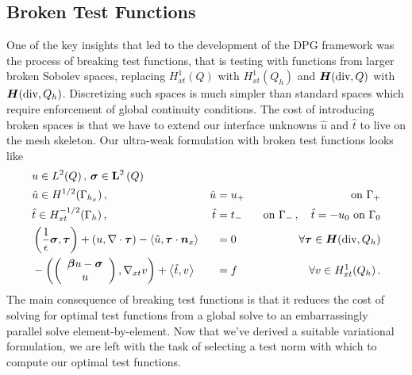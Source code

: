 \documentclass[Dissertation.tex]{subfiles}
\begin{document}
\subsection{Broken Test Functions}
One of the key insights that led to the development of the DPG framework was the process of breaking test functions, 
that is testing with functions from larger broken Sobolev spaces, replacing $H^1_{xt}(Q)$ with  $H^1_{xt}(Q_h)$ 
and $\mbox{\boldmath $H$}(\text{div},Q)$ with $\mbox{\boldmath $H$}(\text{div},Q_h)$.
Discretizing such spaces is much simpler than standard spaces which require enforcement of global continuity conditions.
The cost of introducing broken spaces is that we have to extend our interface unknowns $\hat u$ and $\hat t$ 
to live on the mesh skeleton. %
Our ultra-weak formulation with broken test functions looks like
\begin{equation}
\label{eq:confusionUltraWeakBrokenBF}
	\begin{aligned}
		&u\in L^2(Q)\,,\,\boldsymbol\sigma\in\mathbf{L}^2\left( Q \right)\\
		&\hat u\in H^{1/2}(\Gamma_{h_x})\,,\,&\hat u&=u_+&\text{ on }\Gamma_+\\
		&\hat t\in H^{-1/2}_{xt}(\Gamma_h)\,,\,&\hat t&=t_-&\text{ on }\Gamma_-\,,\quad\hat t=-u_0\text{ on }\Gamma_0\\
		&\left( \frac{1}{\epsilon}\boldsymbol\sigma,\boldsymbol\tau \right)+\left( u,\nabla\cdot\boldsymbol\tau \right)-\left\langle \hat u,\boldsymbol\tau\cdot\boldsymbol n_x \right\rangle&&=0\quad&\forall\boldsymbol\tau\in\mbox{\boldmath $H$}(\text{div},Q_h)\\
		&-\left( \left( \begin{array}{c} \boldsymbol\beta u-\boldsymbol\sigma\\ u\\ \end{array} \right),\nabla_{xt} v \right)+\left\langle \hat t,v \right\rangle&&=f\quad&\forall v\in H^1_{xt}(Q_h)\,.
	\end{aligned}
\end{equation}
The main consequence of breaking test functions is that it reduces the cost of solving for optimal test functions from a global solve 
to an embarrassingly parallel solve element-by-element.
Now that we've derived a suitable variational formulation, we are left with the task of selecting a test norm with which to compute our optimal test functions.
\end{document}
